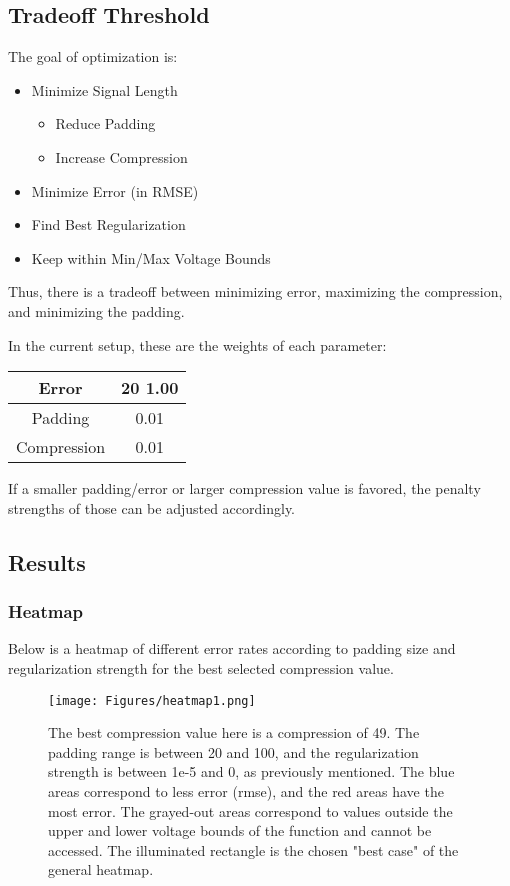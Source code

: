 \subsection{Tradeoff Threshold}
The goal of optimization is:

\begin{itemize}
    \item Minimize Signal Length
    \begin{itemize}
        \item Reduce Padding
        \item Increase Compression
    \end{itemize}
    \item Minimize Error (in RMSE)
    \item Find Best Regularization
    \item Keep within Min/Max Voltage Bounds
\end{itemize}

Thus, there is a tradeoff between minimizing error, maximizing the compression, and minimizing the padding.

In the current setup, these are the weights of each parameter:

\begin{center}
\begin{tabular}{ | c | c | } 
  \hline
   Error & 20 1.00 \\ 
  \hline
  Padding & 0.01 \\ 
  \hline
  Compression & 0.01 \\ 
  \hline
\end{tabular}
\end{center}

If a smaller padding/error or larger compression value is favored, the penalty strengths of those can be adjusted accordingly.
\newpage
\subsection{Results}
\subsubsection{Heatmap}
Below is a heatmap of different error rates according to padding size and regularization strength for the best selected compression value. 

\begin{figure}[h!]
    \centering
\texttt{[image: Figures/heatmap1.png]}
    \caption{The best compression value here is a compression of 49. The padding range is between 20 and 100, and the regularization strength is between 1e-5 and 0, as previously mentioned. The blue areas correspond to less error (rmse), and the red areas have the most error. The grayed-out areas correspond to values outside the upper and lower voltage bounds of the function and cannot be accessed. The illuminated rectangle is the chosen "best case" of the general heatmap.}
\end{figure} \label{heatmap1}

